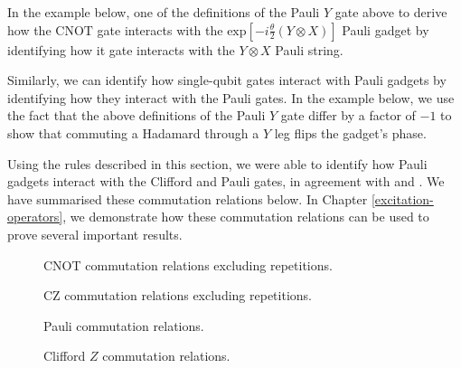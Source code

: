 
In the example below, one of the definitions of the Pauli $Y$ gate above to derive how the $\text{CNOT}$ gate interacts with the $\text{exp} \left[ - i\frac{\theta}{2} \left(Y \otimes X \right) \right]$ Pauli gadget by identifying how it gate interacts with the $Y \otimes X$ Pauli string.


Similarly, we can identify how single-qubit gates interact with Pauli gadgets by identifying how they interact with the Pauli gates. In the example below, we use the fact that the above definitions of the Pauli $Y$ gate differ by a factor of $-1$ to show that commuting a Hadamard through a $Y$ leg flips the gadget's phase.


Using the rules described in this section, we were able to identify how Pauli gadgets interact with the Clifford and Pauli gates, in agreement with \cite{Yeung2020} and \cite{Cowtan2019}. We have summarised these commutation relations below. In Chapter \ref{excitation-operators}, we demonstrate how these commutation relations can be used to prove several important results.

\begin{figure}[H]
    \centering
    \caption{CNOT commutation relations excluding repetitions.}
    \label{cnot-commutations}
\end{figure}

\begin{figure}[H]
    \centering
    \caption{CZ commutation relations excluding repetitions.}
    \label{cz-commutations}
\end{figure}

\begin{figure}[H]
    \centering
    \caption{Pauli commutation relations.}
    \label{pauli-commutations}
\end{figure}

\begin{figure}[H]
    \centering
    \caption{Clifford $Z$ commutation relations.}
    \label{clifford-z-commutations}
\end{figure}

